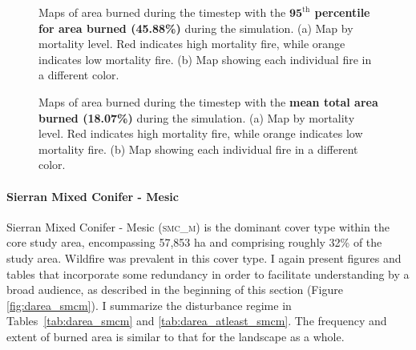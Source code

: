 \begin{figure}[!htbp]
  \centering
  \caption{Maps of area burned during the timestep with the \textbf{$\mathbf{95}^{\text{th}}$ percentile for area burned (45.88\%)} during the simulation. (a) Map by mortality level. Red indicates high mortality fire, while orange indicates low mortality fire. (b) Map showing each individual fire in a different color.}
  \label{fig:darea_max_map}
\end{figure}

\begin{figure}[!htbp]
  \centering
  \caption{Maps of area burned during the timestep with the \textbf{mean total area burned (18.07\%)} during the simulation. (a) Map by mortality level. Red indicates high mortality fire, while orange indicates low mortality fire. (b) Map showing each individual fire in a different color.}
  \label{fig:darea_mean_map}
\end{figure}

\clearpage


\paragraph*{Sierran Mixed Conifer - Mesic}
Sierran Mixed Conifer - Mesic (\textsc{smc\_m}) is the dominant cover type within the core study area, encompassing 57,853 ha and comprising roughly 32\% of the study area. Wildfire was prevalent in this cover type. I again present figures and tables that incorporate some redundancy in order to facilitate understanding by a broad audience, as described in the beginning of this section (Figure \ref{fig:darea_smcm}). I summarize the disturbance regime in Tables~\ref{tab:darea_smcm} and \ref{tab:darea_atleast_smcm}. The frequency and extent of burned area is similar to that for the landscape as a whole.

